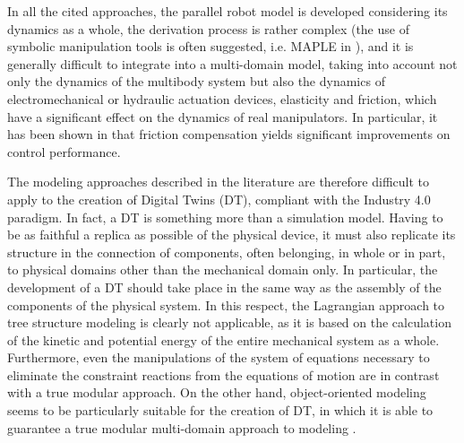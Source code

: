 \documentclass[]{interact}
\theoremstyle{plain}%
\theoremstyle{definition}
\theoremstyle{remark}
\begin{document}
In all the cited approaches, the parallel robot model is developed considering its dynamics as a whole, the derivation process is rather complex (the use of symbolic manipulation tools is often suggested, i.e. MAPLE in \cite{XDZ16}), and it is generally difficult to integrate into a multi-domain model, taking into account not only the dynamics of the multibody system but also the dynamics of electromechanical or hydraulic actuation devices, elasticity and friction, which have a significant effect on the dynamics of real manipulators. In particular, it has been shown in \cite{Grotjahn2004} that friction compensation yields significant improvements on control performance.

The modeling approaches described in the literature are therefore difficult to apply to the creation of Digital Twins (DT), compliant with the Industry 4.0 paradigm. In fact, a DT is something more than a simulation model. Having to be as faithful a replica as possible of the physical device, it must also replicate its structure in the connection of components, often belonging, in whole or in part, to physical domains other than the mechanical domain only. In particular, the development of a DT should take place in the same way as the assembly of the components of the physical system. In this respect, the Lagrangian approach to tree structure modeling is clearly not applicable, as it is based on the calculation of the kinetic and potential energy of the entire mechanical system as a whole. Furthermore, even the manipulations of the system of equations necessary to eliminate the constraint reactions from the equations of motion are in contrast with a true modular approach. On the other hand, object-oriented modeling seems to be particularly suitable for the creation of DT, in which it is able to guarantee a true modular multi-domain approach to modeling \cite{SF18}.
\end{document}
